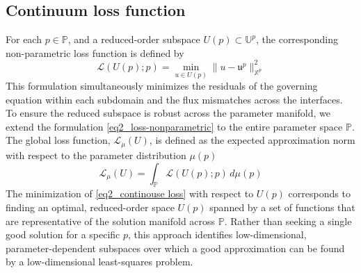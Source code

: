 \documentclass[oneside]{article}
\begin{document}
\subsection{Continuum loss function}\label{Continuum loss function}
For each $p \in \mathbb{P}$, and a reduced-order subspace $U(p) \subset \mathbb{U}^p$, the corresponding non-parametric loss function is defined by
\begin{equation} \label{eq2_loss-nonparametric}
\mathcal{L}(U(p); p) = \min_{u \in U(p)} \|u-\mathfrak{u}^p\|_{\mathbb{X}^p}^2 
\end{equation}
This formulation simultaneously minimizes the residuals of the governing equation within each subdomain and the flux mismatches across the interfaces. To ensure the reduced subspace is robust across the parameter manifold, we extend the formulation \eqref{eq2_loss-nonparametric} to the entire parameter space $\mathbb{P}$. The global loss function, $\mathcal{L}_\mu(U)$, is defined as the expected approximation norm with respect to the parameter distribution $\mu(p)$
\begin{equation}\label{eq2_continouse loss}
\mathcal{L}_\mu(U) = \int_{\mathbb{P}} \mathcal{L}(U(p); p) \, d\mu(p) 
\end{equation}
The minimization of \eqref{eq2_continouse loss} with respect to $U(p)$ corresponds to finding an optimal, reduced-order space $U(p)$ spanned by a set of functions that are representative of the solution manifold across $\mathbb{P}$. Rather than seeking a single good solution for a specific $p$, this approach identifies low-dimensional, parameter-dependent subspaces over which a good approximation can be found by a low-dimensional least-squares problem.





\end{document}
